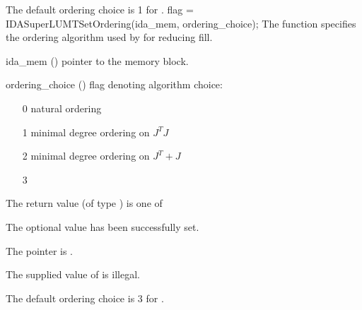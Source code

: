 {{\begin{args}
  \end{args}
}
{
  The default ordering choice is 1 for .
}
{
  flag = IDASuperLUMTSetOrdering(ida\_mem, ordering\_choice);
}
{
  The function  specifies the ordering algorithm
  used by {\idasuperlumt} for reducing fill.
}
{
  \begin{args}
  \item[ida\_mem] ()
    pointer to the {\idas} memory block.
  \item[ordering\_choice] ()
    flag denoting algorithm choice:
    \begin{itemize}
    \item[0] natural ordering
    \item[1] minimal degree ordering on $J^TJ$
    \item[2] minimal degree ordering on $J^T + J$
    \item[3] 
    \end{itemize}
  \end{args}
}
{
  The return value  (of type ) is one of
  \begin{args}
  \item[\Id{IDASLS\_SUCCESS}] 
    The optional value has been successfully set.
  \item[\Id{IDASLS\_MEM\_NULL}]
    The  pointer is .
  \item[\Id{IDASLS\_ILL\_INPUT}]
    The supplied value of  is illegal.
  \end{args}
}
{
  The default ordering choice is 3 for .
}
}
